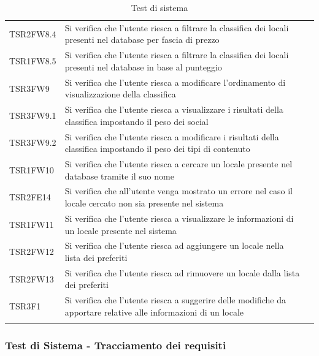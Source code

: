 \begin{longtable}{ m{}<{\centering}  m{}<{\centering}  m{}<{\centering} }
	TSR2FW8.4 & Si verifica che l'utente riesca a filtrare la classifica dei locali presenti nel database per fascia di prezzo & \Ni \\
	TSR1FW8.5 & Si verifica che l'utente riesca a filtrare la classifica dei locali presenti nel database in base al punteggio & \Ni \\
	TSR3FW9 & Si verifica che l'utente riesca a modificare l'ordinamento di visualizzazione della classifica & \Ni \\
	TSR3FW9.1 & Si verifica che l'utente riesca a visualizzare i risultati della classifica impostando il peso dei social & \Ni \\
	TSR3FW9.2 & Si verifica che l'utente riesca a modificare i risultati della classifica impostando il peso dei tipi di contenuto & \Ni \\
	TSR1FW10 & Si verifica che l'utente riesca a cercare un locale presente nel database tramite il suo nome & \Ni \\
	TSR2FE14 & Si verifica che all'utente venga mostrato un errore nel caso il locale cercato non sia presente nel sistema & \Ni \\
	TSR1FW11 & Si verifica che l'utente riesca a visualizzare le informazioni di un locale presente nel sistema & \Ni \\
	TSR2FW12 & Si verifica che l'utente riesca ad aggiungere un locale nella lista dei preferiti & \Ni \\
	TSR2FW13 & Si verifica che l'utente riesca ad rimuovere un locale dalla lista dei preferiti & \Ni \\
	TSR3F1 & Si verifica che l'utente riesca a suggerire delle modifiche da apportare relative alle informazioni di un locale & \Ni \\
	
    \caption{Test di sistema}
\end{longtable}	

\subsubsection{Test di Sistema - Tracciamento dei requisiti}


